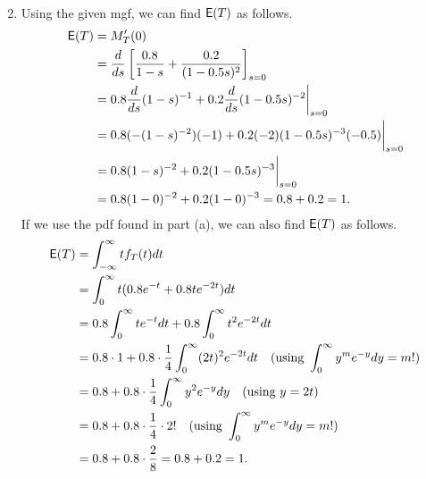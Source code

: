 \documentclass[12pt]{article}
\newcommand{\E}{{\sf E}}
\newenvironment{problem}[2][Problem]{\begin{trivlist}
\item[\hskip \labelsep {\bfseries #1}\hskip \labelsep {\bfseries #2.}]}
{\end{trivlist}}
\begin{document}
\begin{problem}{3}
\begin{enumerate}
\[\begin{aligned}
      \end{aligned}
    \]
    \item Using the given mgf, we can find $\E(T)$ as follows.
    \[
      \begin{aligned}
        \E(T) &= M_T' (0) \\
        &= \frac{d}{ds} \left[ \frac{0.8}{1-s} + 
        \frac{0.2}{(1-0.5s)^{2}} \right]_{s=0} \\
        &= 0.8 \frac{d}{ds} (1-s)^{-1} + 
        0.2 \frac{d}{ds} (1-0.5s)^{-2} \bigg|_{s=0} \\
        &= 0.8 (-(1-s)^{-2})(-1) + 0.2 (-2)(1-0.5s)^{-3}(-0.5) \bigg|_{s=0} \\
        &= 0.8 (1-s)^{-2} + 0.2 (1-0.5s)^{-3} \bigg|_{s=0} \\
        &= 0.8 (1-0)^{-2} + 0.2 (1-0)^{-3} = 0.8 + 0.2 = 1.
      \end{aligned}
    \]
    If we use the pdf found in part (a), we can also find $\E(T)$ as follows.
    \[
      \begin{aligned}
        \E(T) &= \int_{-\infty}^{\infty} t f_T (t) dt \\
        &= \int_0^{\infty} t (0.8e^{-t} + 0.8te^{-2t}) dt \\
        &= 0.8 \int_0^{\infty} t e^{-t} dt + 0.8 \int_0^{\infty} t^2 e^{-2t} dt \\
        &= 0.8 \cdot 1 + 0.8 \cdot \frac{1}{4} \int_0^{\infty} (2t)^2 e^{-2t} dt 
        \quad (\text{using } \int_0^{\infty} y^m e^{-y} dy = m!) \\
        &= 0.8 + 0.8 \cdot \frac{1}{4} \int_0^{\infty} y^2 e^{-y} dy
        \quad (\text{using } y = 2t) \\
        &= 0.8 + 0.8 \cdot \frac{1}{4} \cdot 2!
        \quad (\text{using } \int_0^{\infty} y^m e^{-y} dy = m!) \\
        &= 0.8 + 0.8 \cdot \frac{2}{8} = 0.8 + 0.2 = 1.
      \end{aligned}
    \]
  \end{enumerate}
\end{problem}
\end{document}
